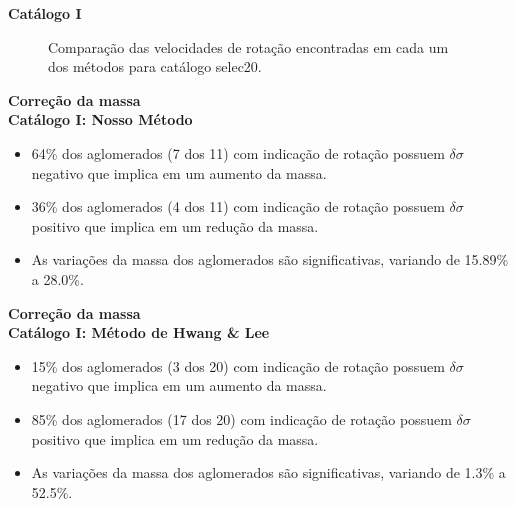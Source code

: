 \documentclass[xcolor=dvipsnames,10pt]{beamer}
\begin{document}
\begin{frame}{\textbf{Catálogo I}}
  \begin{figure}[!htbp] %
  \vspace{-2pt}
  \begin{center}
  \caption{Comparação das velocidades de rotação encontradas em cada um dos métodos para catálogo selec20.}
  \label{vrotselec20}%
  \end{center}
  \end{figure}
\end{frame}

\begin{frame}{\textbf{Correção da massa}}
  \\
  {\textbf{Catálogo I: Nosso Método}}
  \begin{itemize}
    \item 64\% dos aglomerados (7 dos 11) com indicação de rotação possuem $\delta \sigma$ negativo que implica em um aumento da massa.
    \item 36\% dos aglomerados (4 dos 11) com indicação de rotação possuem $\delta \sigma$ positivo que implica em um redução da massa.
    \item As variações da massa dos aglomerados são significativas, variando de 15.89\% a 28.0\%.
  \end{itemize}
\end{frame}

\begin{frame}{\textbf{Correção da massa}}
  \\
  {\textbf{Catálogo I: Método de Hwang \& Lee}}
  \begin{itemize}
    \item 15\% dos aglomerados (3 dos 20) com indicação de rotação possuem $\delta \sigma$ negativo que implica em um aumento da massa.
    \item 85\% dos aglomerados (17 dos 20) com indicação de rotação possuem $\delta \sigma$ positivo que implica em um redução da massa.
    \item As variações da massa dos aglomerados são significativas, variando de 1.3\% a 52.5\%.
  \end{itemize}
\end{frame}
\end{document}
